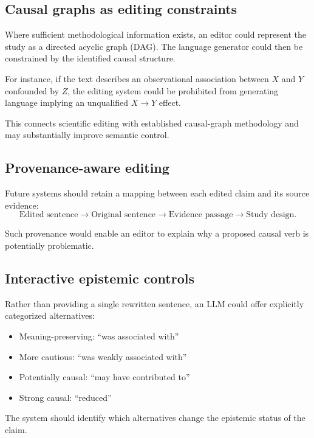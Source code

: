 \documentclass[11pt]{article}
\begin{document}
\subsection{Causal graphs as editing constraints}

Where sufficient methodological information exists, an editor could represent the study as a directed acyclic graph (DAG). The language generator could then be constrained by the identified causal structure.

For instance, if the text describes an observational association between $X$ and $Y$ confounded by $Z$, the editing system could be prohibited from generating language implying an unqualified $X \rightarrow Y$ effect.

This connects scientific editing with established causal-graph methodology and may substantially improve semantic control.

\subsection{Provenance-aware editing}

Future systems should retain a mapping between each edited claim and its source evidence:
\[
  \text{Edited sentence}
  \rightarrow \text{Original sentence}
  \rightarrow \text{Evidence passage}
  \rightarrow \text{Study design}.
\]

Such provenance would enable an editor to explain why a proposed causal verb is potentially problematic.

\subsection{Interactive epistemic controls}

Rather than providing a single rewritten sentence, an LLM could offer explicitly categorized alternatives:

\begin{itemize}
  \item Meaning-preserving: ``was associated with''
  \item More cautious: ``was weakly associated with''
  \item Potentially causal: ``may have contributed to''
  \item Strong causal: ``reduced''
\end{itemize}

The system should identify which alternatives change the epistemic status of the claim.
\end{document}
